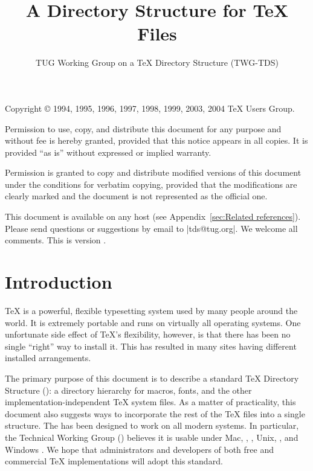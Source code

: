 \documentclass{tdsguide}
\title{A Directory Structure for \TeX{} Files}
\author{TUG Working Group on a \TeX{} Directory Structure (TWG-TDS)}
\begin{document}
\maketitle

\begin{legalnotice}

Copyright {\copyright} 1994, 1995, 1996, 1997, 1998, 1999, 2003, 2004
\TeX{} Users Group.

Permission to use, copy, and distribute this document  for any purpose and without fee is hereby granted,
provided that this notice appears in all copies.  It is provided ``as
is'' without expressed or implied warranty.

Permission is granted to copy and distribute modified versions of this
document under the conditions for verbatim copying, provided that the
modifications are clearly marked and the document is not represented as
the official one.

This document is available on any  host
(see Appendix~\ref{sec:Related references}).
Please send questions or suggestions by email to
\email|tds@tug.org|.  We welcome all comments.   This is version
\the\tdsVersion.

\end{legalnotice}


\tableofcontents


\newpage
\section{Introduction}

\TeX{} is a powerful, flexible typesetting system used by many people
around the world.  It is extremely portable and runs on virtually all
operating systems.  One unfortunate side effect of \TeX{}'s flexibility,
however, is that there has been no single ``right'' way to install it.
This has resulted in many sites having different installed arrangements.

The primary purpose of this document is to describe a standard \TeX{}
Directory Structure (): a directory hierarchy for macros,
fonts, and the other implementation-independent \TeX{} system files.  As
a matter of practicality, this document also suggests ways to
incorporate the rest of the \TeX{} files into a single structure.  The
 has been designed to work on all modern systems.  In
particular, the Technical Working Group () believes it is usable
under Mac, , , Unix, , and
Windows \@.  We hope that administrators and developers of both
free and commercial \TeX{} implementations will adopt this standard.
\end{document}
